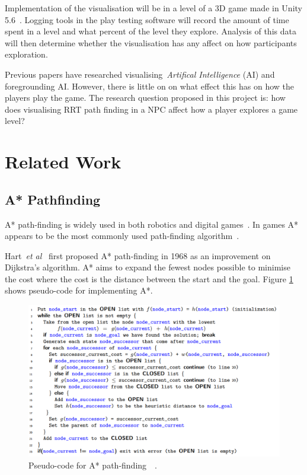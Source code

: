 \documentclass[journal]{IEEEtran}
\begin{document}
Implementation of the visualisation will be in a level of a 3D game made in Unity 5.6~\cite{software:Unity}. Logging tools in the play testing software will record the amount of time spent in a level and what percent of the level they explore.   Analysis of this data will then determine whether the visualisation has any affect on how participants exploration.

Previous papers have researched visualising~\textit{Artifical Intelligence} (AI) and foregrounding AI. However, there is little on on what effect this has on how the players play the game.
The research question proposed in this project is: how does visualising RRT path finding in a NPC affect how a player explores a game level?

\section{Related Work}

\subsection{A* Pathfinding}
A* path-finding is widely used in both robotics and digital games~\cite{Algfoor2015}. In games A* appears to be the most commonly used path-finding algorithm~\cite{Algfoor2015}.

Hart~\textit{et al}~\cite{Hart1968} first proposed A* path-finding in 1968 as an improvement on Dijkstra's algorithm. A* aims to expand the fewest nodes possible to minimise the cost where the cost is the distance between the start and the goal. Figure \ref{A*Pseudo} shows pseudo-code for implementing A*. 

\begin{figure}[h]
	\includegraphics[width=1.0\linewidth]{APseudocode.png}
	\caption{ Pseudo-code for A* path-finding~\cite{Hart1968}~\cite{pseudocode:A*}.}
	\label{A*Pseudo}
\end{figure} 
\end{document}
